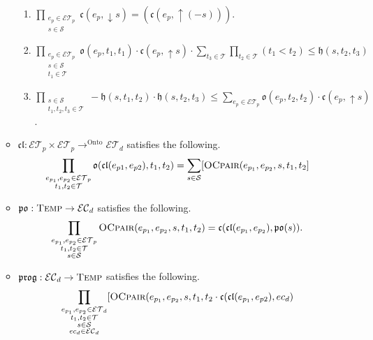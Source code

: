 \begin{itemize}
\begin{itemize}
\begin{enumerate}
			            \item $\displaystyle\prod_{\substack{e_p \in \mathcal{ET}_p \\ s \in \mathcal{S}}}\mathfrak{c}(e_p, \downarrow s) = (\mathfrak{c}(e_p, \uparrow(- s)))$.
			            \item $\displaystyle \prod_{\substack{e_p \in \mathcal{ET}_p \\ s \in \mathcal{S} \\ t_1 \in \mathcal{T}}} \mathfrak{o}(e_p, t_1, t_1) \cdot \mathfrak{c}(e_p, \uparrow s) \cdot
				                  \sum_{t_3 \in \mathcal{T}}\prod_{t_2 \in \mathcal{T}} (t_1 < t_2)  \leq \mathfrak{h}(s, t_2, t_3)$
			            \item $\displaystyle
				                  \prod_{\substack{s \in \mathcal{S} \\ t_1, t_2, t_3 \in \mathcal{T}}}- \mathfrak{h}(s, t_1, t_2) \cdot \mathfrak{h}(s, t_2, t_3) \leq
				                  \sum_{e_p \in \mathcal{ET}_p} \mathfrak{o}(e_p, t_2, t_2) \cdot \mathfrak{c}(e_p, \uparrow s)$.
		            \end{enumerate}
		      \item $\mathfrak{cl} : \mathcal{ET}_p \times \mathcal{ET}_p \to^{\text{Onto}} \mathcal{ET}_d$ satisfies the following.
		            $$\prod_{\substack{e_{p_1}, e_{p_2} \in \mathcal{ET}_p \\ t_1, t_2 \in \mathcal{T}}} \mathfrak{o}(\mathfrak{cl}(e_{p1}, e_{p2}), t_1, t_2) =
			            \sum_{\substack{s \in \mathcal{S}}}[ \textsc{OCpair}(e_{p_1}, e_{p_2}, s, t_1, t_2]$$
		      \item $\mathfrak{po} : \textsc{Temp} \to \mathcal{EC}_d$ satisfies the following.
		            $$
			            \prod_{\substack{e_{p_1}, e_{p_2} \in \mathcal{ET}_p \\ t_1, t_2 \in \mathcal{T} \\ s \in \mathcal{S}}}\textsc{OCpair}(e_{p_1}, e_{p_2}, s, t_1, t_2) = \mathfrak{c}(\mathfrak{cl}(e_{p_1}, e_{p_2}), \mathfrak{po}(s)).$$
		      \item $\mathfrak{prog} : \mathcal{EC}_d \to \textsc{Temp}$ satisfies the following.
		            $$
			            \prod_{\substack{e_{p_1}, e_{p_2} \in \mathcal{ET}_d \\ t_1, t_2 \in \mathcal{T}\\ s \in \mathcal{S} \\ ec_d \in \mathcal{EC}_d}}
			            [
			            \textsc{OCpair}(e_{p_1}, e_{p_2}, s, t_1, t_2 \cdot \mathfrak{c}(\mathfrak{cl} (e_{p_1}, e_{p2}), ec_d)
$$
\end{itemize}
\end{itemize}

